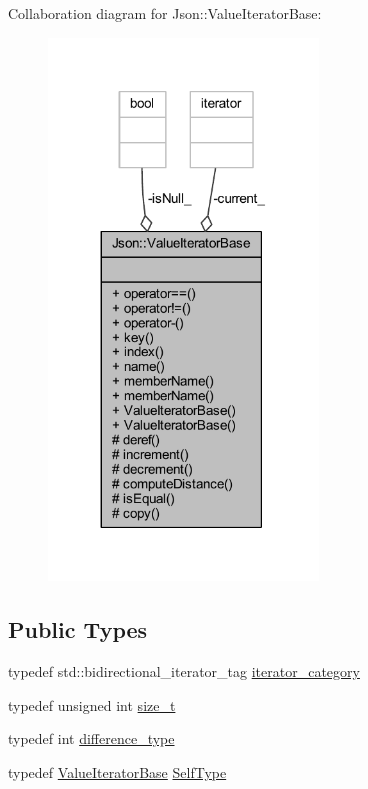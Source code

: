 Collaboration diagram for Json\+:\+:Value\+Iterator\+Base\+:\nopagebreak
\begin{figure}[H]
\begin{center}
\leavevmode
\includegraphics[width=203pt]{class_json_1_1_value_iterator_base__coll__graph}
\end{center}
\end{figure}
\subsection*{Public Types}
\begin{DoxyCompactItemize}
\item 
typedef std\+::bidirectional\+\_\+iterator\+\_\+tag \hyperlink{class_json_1_1_value_iterator_base_a02fd11a4fbdc0007da1e8bcf5e6b83c3}{iterator\+\_\+category}
\item 
typedef unsigned int \hyperlink{class_json_1_1_value_iterator_base_a9d3a3c7ce5cdefe23cb486239cf07bb5}{size\+\_\+t}
\item 
typedef int \hyperlink{class_json_1_1_value_iterator_base_a4e44bf8cbd17ec8d6e2c185904a15ebd}{difference\+\_\+type}
\item 
typedef \hyperlink{class_json_1_1_value_iterator_base}{Value\+Iterator\+Base} \hyperlink{class_json_1_1_value_iterator_base_a9d2a940d03ea06d20d972f41a89149ee}{Self\+Type}
\end{DoxyCompactItemize}

